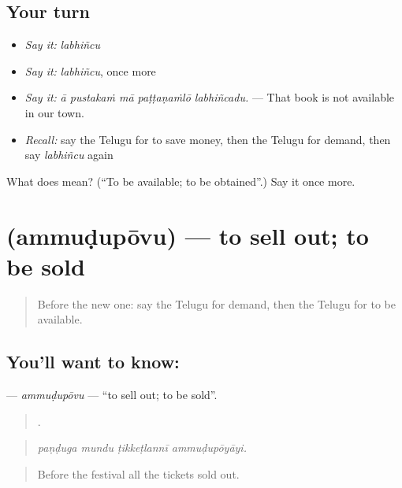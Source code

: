 \subsection*{Your turn}
\begin{itemize}
\raggedright
  \item \emph{Say it:} \emph{labhiñcu}
  \item \emph{Say it:} \emph{labhiñcu}, once more
  \item \emph{Say it:} \emph{ā pustakaṁ mā paṭṭaṇaṁlō labhiñcadu.} — That book is not available in our town.
  \item \emph{Recall:} say the Telugu for to save money, then the Telugu for demand, then say \emph{labhiñcu} again
\end{itemize}

\begin{tcolorbox}[breakable,colback=teal!4,colframe=teal!35!black,title={Before you move on}]
What does  mean? (\textquotedblleft{}To be available; to be obtained\textquotedblright{}.) Say it once more.
\end{tcolorbox}
\section[\texorpdfstring{\te{అమ్ముడుపోవు} (ammuḍupōvu)}{అమ్ముడుపోవు (ammuḍupōvu)}]{ (ammuḍupōvu) — to sell out; to be sold}

\label{lesson:TE-C487-ammudupovu}



\begin{quote}
Before the new one: say the Telugu for demand, then the Telugu for to be available.
\end{quote}

\subsection*{You'll want to know: }
\textbf{} — \emph{ammuḍupōvu} — \textquotedblleft{}to sell out; to be sold\textquotedblright{}.

\begin{quote}
   .
\end{quote}

\begin{quote}
\emph{paṇḍuga mundu ṭikkeṭlannī ammuḍupōyāyi.}
\end{quote}

\begin{quote}
Before the festival all the tickets sold out.
\end{quote}

